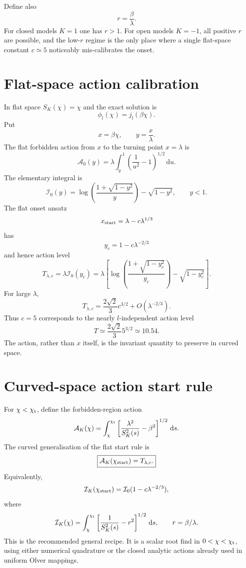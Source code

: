 \documentclass[11pt]{article}
\newcommand{\SK}{S_K}
\newcommand{\chip}{\chi_{\rm t}}
\newcommand{\chistart}{\chi_{\rm start}}
\newcommand{\Acal}{\mathcal{A}}
\newcommand{\Ical}{\mathcal{I}}
\newcommand{\dd}{\,\mathrm{d}}
\newcommand{\lam}{\lambda}
\begin{document}
Define also
\[
  r=\frac{\beta}{\lam}.
\]
For closed models \(K=1\) one has \(r>1\).  For open models \(K=-1\), all
positive \(r\) are possible, and the low-\(r\) regime is the only place where a
single flat-space constant \(c\simeq5\) noticeably mis-calibrates the onset.

\section{Flat-space action calibration}

In flat space \(\SK(\chi)=\chi\) and the exact solution is
\[
  \phi_l(\chi)=j_l(\beta\chi).
\]
Put
\[
  x=\beta\chi,
  \qquad
  y=\frac{x}{\lam}.
\]
The flat forbidden action from \(x\) to the turning point \(x=\lam\) is
\[
\Acal_0(y)
=\lam\int_y^1\left(\frac{1}{u^2}-1\right)^{1/2}\dd u.
\]
The elementary integral is
\[
  \Ical_0(y)
  =
  \log\left(\frac{1+\sqrt{1-y^2}}{y}\right)-\sqrt{1-y^2},
  \qquad y<1.
\]
The flat onset ansatz
\[
  x_{\rm start}=\lam-c\lam^{1/3}
\]
has
\[
  y_c=1-c\lam^{-2/3}
\]
and hence action level
\begin{equation}
\boxed{
T_{\lam,c}
=\lam\Ical_0(y_c)
=\lam\left[
\log\left(\frac{1+\sqrt{1-y_c^2}}{y_c}\right)-\sqrt{1-y_c^2}
\right].
}
\label{eq:T_exact}
\end{equation}
For large \(\lam\),
\[
  T_{\lam,c}=\frac{2\sqrt2}{3}c^{3/2}+O(\lam^{-2/3}).
\]
Thus \(c=5\) corresponds to the nearly \(l\)-independent action level
\[
  T\simeq \frac{2\sqrt2}{3}5^{3/2}\simeq 10.54.
\]
The action, rather than \(x\) itself, is the invariant quantity to preserve in
curved space.

\section{Curved-space action start rule}

For \(\chi<\chip\), define the forbidden-region action
\begin{equation}
\Acal_K(\chi)
=
\int_\chi^{\chip}
\left[
\frac{\lam^2}{\SK^2(s)}-\beta^2
\right]^{1/2}\dd s.
\label{eq:curved_action}
\end{equation}
The curved generalisation of the flat start rule is
\begin{equation}
\boxed{
\Acal_K(\chistart)=T_{\lam,c}.
}
\label{eq:action_rule}
\end{equation}
Equivalently,
\[
\Ical_K(\chistart)
=
\Ical_0(1-c\lam^{-2/3}),
\]
where
\[
\Ical_K(\chi)=
\int_\chi^{\chip}
\left[\frac{1}{\SK^2(s)}-r^2\right]^{1/2}\dd s,
\qquad r=\beta/\lam.
\]
This is the recommended general recipe.  It is a scalar root find in
\(0<\chi<\chip\), using either numerical quadrature or the closed analytic
actions already used in uniform Olver mappings.
\end{document}
